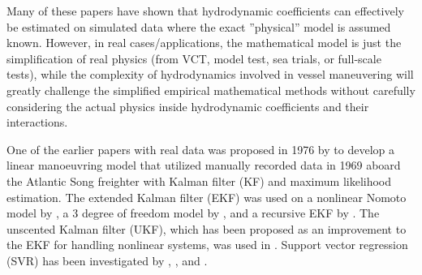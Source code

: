 Many of these papers have shown that hydrodynamic coefficients can effectively be estimated on simulated data where the exact ''physical'' model is assumed known. However, in real cases/applications, the mathematical model is just the simplification of real physics (from VCT, model test, sea trials, or full-scale tests), while the complexity of hydrodynamics involved in vessel maneuvering will greatly challenge the simplified empirical mathematical methods without carefully considering the actual physics inside hydrodynamic coefficients and their interactions. 

One of the earlier papers with real data was proposed in 1976 by \citet{astrom_identification_1976} to develop a linear manoeuvring model that utilized manually recorded data in 1969 aboard the Atlantic Song freighter with Kalman filter (KF) and maximum likelihood estimation. 
The extended Kalman filter (EKF) was used on a nonlinear Nomoto model by \citet{perera_system_2015}, a 3 degree of freedom model by \citet{shi_identification_2009}, and a recursive EKF by \citet{alexandersson_system_2022}.
The unscented Kalman filter (UKF), which has been proposed as an improvement to the EKF for handling nonlinear systems, was used in \citet{revestido_herrero_two-step_2012}.
Support vector regression (SVR) has been investigated by \citet{luo_parameter_2016}, \citet{zhu_parameter_2017}, and \citet{wang_parameter_2021}. 

